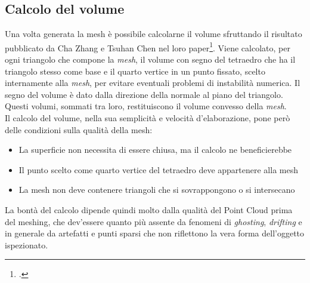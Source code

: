 \subsection{Calcolo del volume}
Una volta generata la mesh è possibile calcolarne il volume sfruttando il risultato pubblicato da Cha Zhang e Tsuhan Chen nel loro paper\footcite{http://research.microsoft.com/en-us/um/people/chazhang/publications/icip01_ChaZhang.pdf}. Viene calcolato, per ogni triangolo che compone la \emph{mesh}, il volume con segno del tetraedro che ha il triangolo stesso come base e il quarto vertice in un punto fissato, scelto internamente alla \emph{mesh}, per evitare eventuali problemi di instabilità numerica. Il segno del volume è dato dalla direzione della normale al piano del triangolo. Questi volumi, sommati tra loro, restituiscono il volume convesso della \emph{mesh}.\\
Il calcolo del volume, nella sua semplicità e velocità d'elaborazione, pone però delle condizioni sulla qualità della mesh:
\begin{itemize}
\item La superficie non necessita di essere chiusa, ma il calcolo ne beneficierebbe
\item Il punto scelto come quarto vertice del tetraedro deve appartenere alla mesh
\item La mesh non deve contenere triangoli che si sovrappongono o si intersecano
\end{itemize}
La bontà del calcolo dipende quindi molto dalla qualità del Point Cloud prima del meshing, che dev'essere quanto più assente da fenomeni di \emph{ghosting}, \emph{drifting} e in generale da artefatti e punti sparsi che non riflettono la vera forma dell'oggetto ispezionato.
